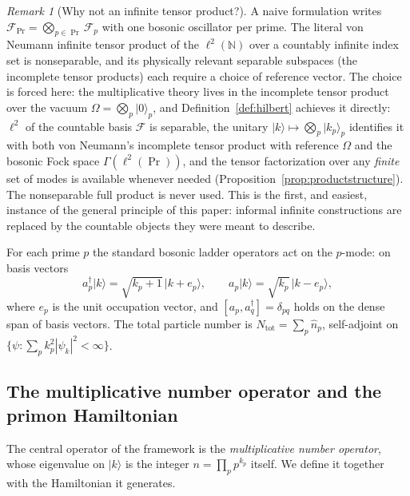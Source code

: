 \documentclass[11pt,a4paper]{article}
\theoremstyle{plain}
\theoremstyle{definition}
\theoremstyle{remark}
\newtheorem{remark}[theorem]{Remark}
\newcommand{\ket}[1]{\lvert #1\rangle}
\newcommand{\Nn}{\mathbb{N}}
\newcommand{\Fock}{\mathcal{F}}
\newcommand{\Nhat}{\widehat{N}}
\begin{document}
\begin{remark}[Why not an infinite tensor product?]
A naive formulation writes $\Fock_{\Pr}=\bigotimes_{p\in\Pr}\Fock_{p}$ with one bosonic oscillator
per prime. The literal von Neumann infinite tensor product of the $\ell^{2}(\Nn)$ over a
countably infinite index set is nonseparable, and its physically relevant separable subspaces
(the incomplete tensor products) each require a choice of reference vector. The choice is
forced here: the multiplicative theory lives in the incomplete tensor product over the
vacuum $\Omega=\bigotimes_{p}\ket{0}_{p}$, and Definition~\ref{def:hilbert} achieves it
directly: $\ell^{2}$ of the countable basis $\mathcal{F}$ is separable, the unitary
$\ket{k}\mapsto\bigotimes_{p}\ket{k_{p}}_{p}$ identifies it with both von Neumann's
incomplete tensor product with reference $\Omega$ and the bosonic Fock space
$\Gamma(\ell^{2}(\Pr))$, and the tensor factorization over any \emph{finite} set of modes is
available whenever needed (Proposition~\ref{prop:productstructure}). The nonseparable full
product is never used. This is the first, and easiest, instance of the
general principle of this paper: informal infinite constructions are replaced by the countable
objects they were meant to describe.
\end{remark}

For each prime $p$ the standard bosonic ladder operators act on the $p$-mode: on basis vectors
\begin{equation}
a_{p}^{\dagger}\ket{k}=\sqrt{k_{p}+1}\,\ket{k+e_{p}},
\qquad
a_{p}\ket{k}=\sqrt{k_{p}}\,\ket{k-e_{p}},
\end{equation}
where $e_{p}$ is the unit occupation vector, and $[a_{p},a_{q}^{\dagger}]=\delta_{pq}$ holds
on the dense span of basis vectors. The total particle number is
$\Nhat_{\mathrm{tot}}=\sum_{p}\hat n_{p}$, self-adjoint on
$\{\psi:\sum_{p}k_{p}^{2}|\psi_{k}|^{2}<\infty\}$.

\subsection{The multiplicative number operator and the primon Hamiltonian}

The central operator of the framework is the \emph{multiplicative number operator}, whose
eigenvalue on $\ket{k}$ is the integer $n=\prod_{p}p^{k_{p}}$ itself. We define it together
with the Hamiltonian it generates.
\end{document}
